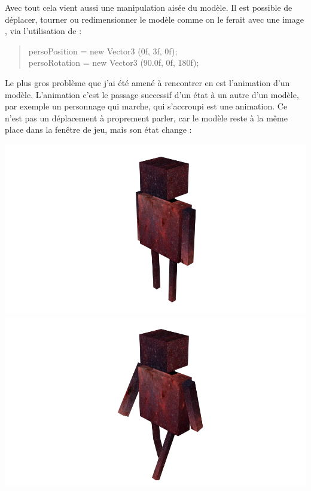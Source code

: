 \documentclass{article}
\begin{document}
Avec tout cela vient aussi une manipulation aisée du modèle. Il est possible de déplacer, tourner ou redimensionner le modèle  comme on le ferait avec une image , via l'utilisation de  : 
\begin{quote}
persoPosition = new Vector3 (0f, 3f, 0f); \\
persoRotation = new Vector3 (90.0f, 0f, 180f);
\end{quote}

Le plus gros problème que j'ai été amené à rencontrer en  est l'animation d'un modèle. L'animation c'est le passage successif d'un état à un autre d'un modèle, par exemple un personnage qui marche, qui s'accroupi est une animation. Ce n'est pas un déplacement à proprement parler, car le modèle  reste à la même place dans la fenêtre de jeu, mais son état change : 

\begin{center}
\includegraphics[scale=0.5]{static}
\includegraphics[scale=0.5]{MARCHE}
\end{center}
\end{document}
